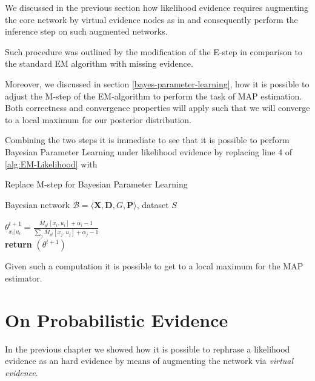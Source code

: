 \documentclass[11pt]{article}
\begin{document}
\begin{article}
We discussed in the previous section how likelihood evidence
requires augmenting the core network by virtual evidence nodes as
in \cite{pearl2014probabilistic} and consequently perform the
inference step on such augmented networks.

Such procedure was outlined by the modification of the E-step in
comparison to the standard EM algorithm with missing evidence.

Moreover, we discussed in section \ref{bayes-parameter-learning}, how
it is possible to adjust the M-step of the EM-algorithm to perform
the task of MAP estimation. Both correctness and convergence
properties will apply such that we will converge to a local maximum
for our posterior distribution.

Combining the two steps it is immediate to see that it is possible
to perform Bayesian Parameter Learning under likelihood evidence
by replacing line 4 of \ref{alg:EM-Likelihood} with 

\begin{algorithm*}[h!]
\caption{Replace M-step for Bayesian Parameter Learning}
\label{alg:Bayes-EM-Likelihood}
\vspace{-10pt}
\begin{multicols}{2}
\begin{algorithmic}[1] 
\Require Bayesian network $\mathcal{B}=\langle \mathbf{X},\mathbf{D}, G, \mathbf{P} \rangle$, dataset $S$ 

   \State $\theta_{x_{i}|u_{i}}^{t+1}=\frac{\bar{M}_{\theta^{t}}[x_{i},u_{i}] + \alpha_i - 1}{\sum_j \bar{M}_{\theta^{t}}[x_{j},u_{j}] + \alpha_j - 1}$\\
   
   \textbf{return} $(\theta^{t+1})$

\end{algorithmic}
\end{multicols}
\end{algorithm*}

Given such a computation it is possible to get to a local maximum
for the MAP estimator.


\section{On Probabilistic Evidence}
\label{sec:orgf2153dd}

In the previous chapter we showed how it is possible to rephrase a
likelihood evidence as an hard evidence by means of augmenting the
network via \emph{virtual evidence}.


\end{article}
\end{document}
